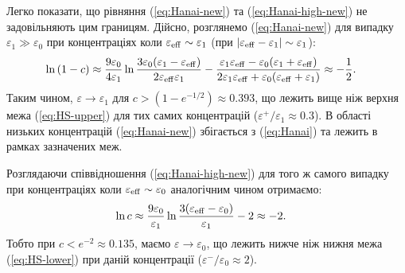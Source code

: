 \documentclass[14pt,twoside]{vakthesis}
\begin{document}
Легко показати, що рівняння (\ref{eq:Hanai-new}) та (\ref{eq:Hanai-high-new}) не задовільняють цим границям. Дійсно, розглянемо (\ref{eq:Hanai-new}) для випадку $\varepsilon_1 \gg \varepsilon_0$ при концентраціях коли $\varepsilon_{\rm eff} \sim \varepsilon_1$ (при $|\varepsilon_{\rm eff} - \varepsilon_1| \sim \varepsilon_1$): 
\begin{equation}
\begin{split}
\ln{(1-c)} &\approx \frac{9 \varepsilon_0}{4\varepsilon_1} \ln{ \frac{3\varepsilon_0 (\varepsilon_1-\varepsilon_{\rm eff})}{2\varepsilon_{\rm eff} \varepsilon_1} }
- \frac{\varepsilon_1 \varepsilon_{\rm eff} - \varepsilon_0 ( \varepsilon_1 + \varepsilon_{\rm eff})}{2\varepsilon_1 \varepsilon_{\rm eff} + \varepsilon_0 (\varepsilon_{\rm eff} + \varepsilon_1)} \approx - \frac{1}{2}.
\end{split}
\end{equation}
Таким чином, $\varepsilon \to \varepsilon_1$ для $c > (1 - e^{-1/2}) \approx 0.393$, що лежить вище ніж верхня межа (\ref{eq:HS-upper}) для тих самих концентрацій ($\varepsilon^{+}/\varepsilon_1 \approx 0.3$). В області низьких концентрацій (\ref{eq:Hanai-new}) збігається з (\ref{eq:Hanai}) та лежить в рамках зазначених меж. 

Розглядаючи співвідношення (\ref{eq:Hanai-high-new}) для того ж самого випадку при концентраціях коли $\varepsilon_{\rm eff} \sim \varepsilon_0$ аналогічним чином отримаємо:
\begin{equation}
\begin{split}
\ln{c} &\approx \frac{9 \varepsilon_0}{\varepsilon_1} \ln{ \frac{3(\varepsilon_{\rm eff} - \varepsilon_0)}{\varepsilon_1} }
- 2 \approx -2.
\end{split}
\end{equation}
Тобто при $c < e^{-2} \approx 0.135$, маємо $\varepsilon \to \varepsilon_0$, що лежить нижче ніж нижня межа (\ref{eq:HS-lower}) при даній концентрації ($\varepsilon^{-}/\varepsilon_0 \approx 2$).
\end{document}
